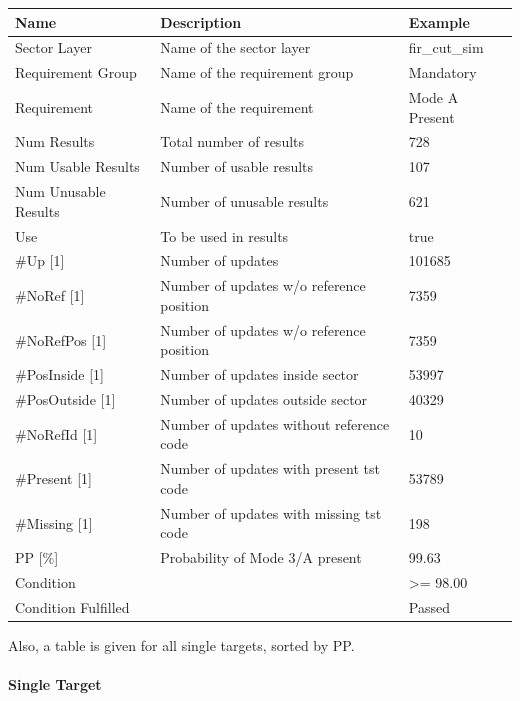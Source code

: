 \begin{center}
 \begin{table}[H]
  \begin{tabularx}{\textwidth}{ | l | X |  l | }
    \hline
    \textbf{Name} & \textbf{Description} & \textbf{Example} \\ \hline
    Sector Layer & Name of the sector layer & fir\_cut\_sim \\ \hline
    Requirement Group & Name of the requirement group & Mandatory \\ \hline
    Requirement & Name of the requirement & Mode A Present \\ \hline
    Num Results & Total number of results & 728 \\ \hline
    Num Usable Results & Number of usable results & 107 \\ \hline
    Num Unusable Results & Number of unusable results & 621 \\ \hline
    Use & To be used in results & true \\ \hline
    \#Up [1] & Number of updates & 101685 \\ \hline
    \#NoRef [1] & Number of updates w/o reference position & 7359 \\ \hline
    \#NoRefPos [1] & Number of updates w/o reference position  & 7359 \\ \hline
    \#PosInside [1] & Number of updates inside sector & 53997 \\ \hline
    \#PosOutside [1] & Number of updates outside sector & 40329 \\ \hline
    \#NoRefId [1] & Number of updates without reference code & 10 \\ \hline
    \#Present [1] & Number of updates with present tst code & 53789 \\ \hline
    \#Missing [1] & Number of updates with missing tst code & 198 \\ \hline
    PP [\%] & Probability of Mode 3/A present & 99.63 \\ \hline
    Condition &  & >= 98.00 \\ \hline
    Condition Fulfilled &  & Passed \\ \hline
\end{tabularx}
\end{table}
\end{center}

Also, a table is given for all single targets, sorted by PP.

\paragraph{Single Target}

